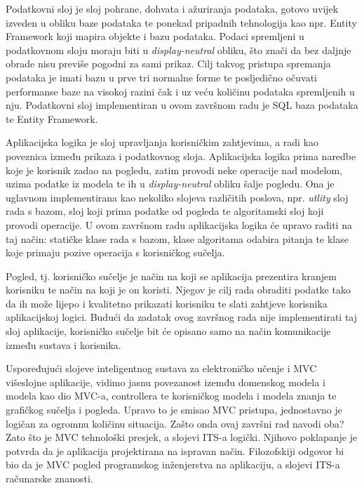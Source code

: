 \documentclass[times, utf8, zavrsni, numeric]{fer}
\begin{document}
\par
Podatkovni sloj je sloj pohrane, dohvata i ažuriranja podataka, gotovo uvijek izveden u obliku baze podataka te ponekad pripadnih tehnologija kao npr. Entity Framework koji mapira objekte i bazu podataka. Podaci spremljeni u podatkovnom sloju moraju biti u \textit{display-neutral} obliku, što znači da bez daljnje obrade nisu previše pogodni za sami prikaz. Cilj takvog pristupa spremanja podataka je imati bazu u prve tri normalne forme te posljedično očuvati performanse baze na visokoj razini čak i uz veću količinu podataka spremljenih u nju. Podatkovni sloj implementiran u ovom završnom radu je SQL baza podataka te Entity Framework.
\par
Aplikacijska logika je sloj upravljanja korisničkim zahtjevima, a radi kao poveznica između prikaza i podatkovnog sloja. Aplikacijska logika prima naredbe koje je korisnik zadao na pogledu, zatim provodi neke operacije nad modelom, uzima podatke iz modela te ih u \textit{display-neutral} obliku šalje pogledu. Ona je uglavnom implementirana kao nekoliko slojeva različitih poslova, npr. \textit{utlity} sloj rada s bazom, sloj koji prima podatke od pogleda te algoritamski sloj koji provodi operacije. U ovom završnom radu aplikacijska logika će upravo raditi na taj način: statičke klase rada s bazom, klase algoritama odabira pitanja te klase koje primaju pozive operacija s korisničkog sučelja.
\par
Pogled, tj. korisničko sučelje je način na koji se aplikacija prezentira kranjem korisniku te način na koji je on koristi. Njegov je cilj rada obraditi podatke tako da ih može lijepo i kvalitetno prikazati korisniku te slati zahtjeve korisnika aplikacijskoj logici. Budući da zadatak ovog završnog rada nije implementirati taj sloj aplikacije, korisničko sučelje bit će opisano samo na način komunikacije između sustava i korisnika.
\par
Uspoređujući slojeve inteligentnog sustava za elektroničko učenje i MVC višeslojne aplikacije, vidimo jasnu povezanost izemđu domenskog modela i modela kao dio MVC-a, controllera te korisničkog modela i modela znanja te grafičkog sučelja i pogleda. Upravo to je smisao MVC pristupa, jednostavno je logičan za ogromnu količinu situacija. Zašto onda ovaj završni rad navodi oba? Zato što je MVC tehnološki presjek, a slojevi ITS-a logički. Njihovo poklapanje je potvrda da je aplikacija projektirana na ispravan način. Filozofskiji odgovor bi bio da je MVC pogled programskog inženjerstva na aplikaciju, a slojevi ITS-a računarske znanosti.
\end{document}
